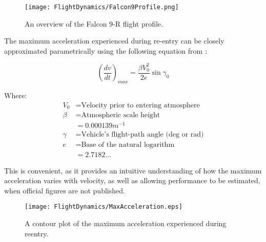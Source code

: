 \begin{figure}[!htb] 
    \centering
    \texttt{[image: FlightDynamics/Falcon9Profile.png]} 
    \caption{An overview of the Falcon 9-R flight profile.}
    \label{fig:Falcon9Profile}
\end{figure}


The maximum acceleration experienced during re-entry can be closely approximated parametrically using the following equation from \cite{eastre}: 

\begin{equation}
(\frac{dv}{dt})_{max} = \frac{\beta V_0^2}{2e} \sin \gamma_0
\end{equation}

Where:
\begin{align*}
V_0 &= \text{Velocity prior to entering atmosphere}\\
 \beta &= \text{Atmospheric scale height}\\
       &= 0.000139 m^{-1}\\
\gamma &= \text{Vehicle's flight-path angle (deg or rad)}\\
     e &= \text{Base of the natural logarithm}\\
       &= 2.7182\ldots
\end{align*}

This is convenient, as it provides an intuitive understanding of how the maximum acceleration varies with velocity, as well as allowing performance to be estimated, when official figures are not published. 


\begin{figure}[!htb] 
    \centering
    \texttt{[image: FlightDynamics/MaxAcceleration.eps]} 
    \caption{A contour plot of the maximum acceleration experienced during reentry.}
    \label{fig:MaxReentryAcceleration}
\end{figure}


